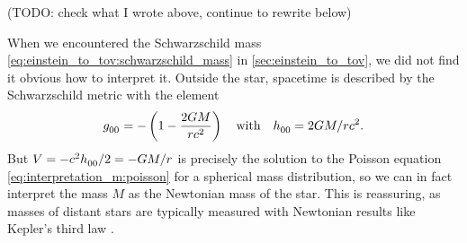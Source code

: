 (TODO: check what I wrote above, continue to rewrite below)

When we encountered the Schwarzschild mass \eqref{eq:einstein_to_tov:schwarzschild_mass} in \cref{sec:einstein_to_tov}, we did not find it obvious how to interpret it.
Outside the star, spacetime is described by the Schwarzschild metric with the element
\begin{equation}
	g\indices{_0_0} = - \left( 1 - \frac{2 G M}{r c^2} \right)
	\quad \text{with} \quad
	h\indices{_0_0} = 2GM/rc^2 .
	\label{eq:weak_field_limit:schwarzschild_metric_tt}
\end{equation}
But $V = -c^2 h\indices{_0_0} / 2 = -G M / r$ is precisely the solution to the Poisson equation \eqref{eq:interpretation_m:poisson} for a spherical mass distribution, so we can in fact interpret the mass $M$ as the Newtonian mass of the star.
This is reassuring, as masses of distant stars are typically measured with Newtonian results like Kepler's third law \cite[box 23.1]{ref:mtw}.

